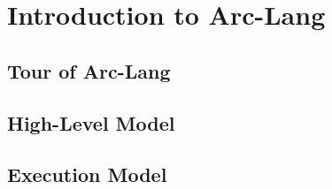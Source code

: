 
\section{Introduction to Arc-Lang}


\subsection{Tour of Arc-Lang}


\subsection{High-Level Model}


\subsection{Execution Model}

